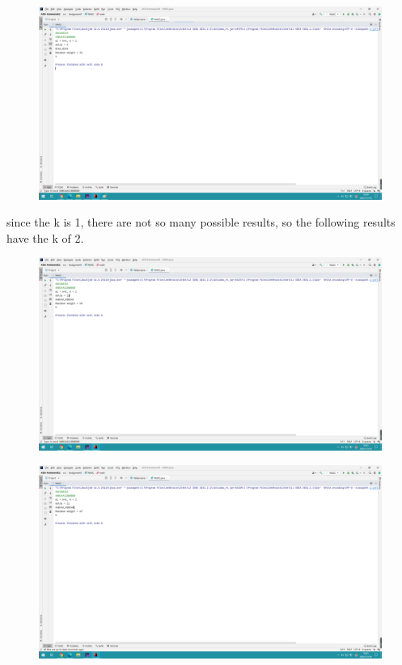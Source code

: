 \documentclass[]{article}
\begin{document}
	\begin{figure}[H]
		\centering
		\includegraphics[width=1\linewidth]{screen/A1-11}
		\caption{}
		\label{fig:a1-1}
	\end{figure}
	
	\noindent since the k is 1, there are not so many possible results, so the following results have the k of 2.  \\
	
	\begin{figure}[H]
		\centering
		\includegraphics[width=1\linewidth]{screen/A1-4}
		\caption{}
		\label{fig:a1-1}
	\end{figure}
	
	\begin{figure}[H]
		\centering
		\includegraphics[width=1\linewidth]{screen/A1-5}
		\caption{}
		\label{fig:a1-1}
	\end{figure}
	
\end{document}
